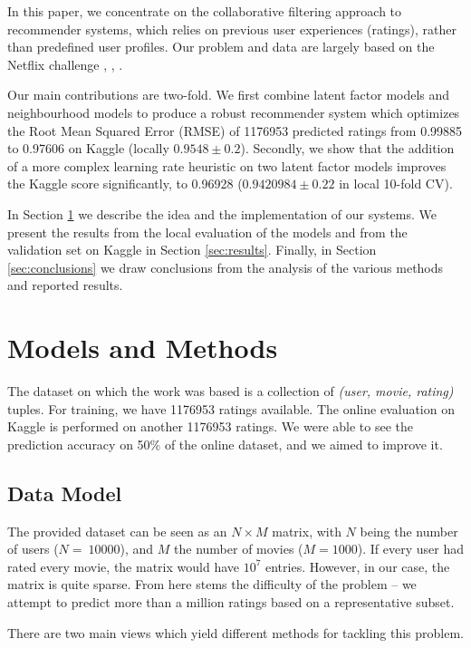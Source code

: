 \documentclass[10pt,conference,compsocconf]{IEEEtran}
\begin{document}
	In this paper, we concentrate on the collaborative filtering approach to recommender systems, which relies on previous user experiences (ratings), rather than predefined user profiles. Our problem and data are largely based on the Netflix challenge \cite{SMH07}, \cite{Koren09matrixfactorization}, \cite{funk2011netflix}.
	
	Our main contributions are two-fold. We first combine latent factor models and neighbourhood models to produce a robust recommender system which optimizes the Root Mean Squared Error (RMSE) of 1176953 predicted ratings from  0.99885 to 0.97606 on Kaggle (locally $0.9548\pm0.2$). Secondly, we show that the addition of a more complex learning rate heuristic on two latent factor models improves the Kaggle score significantly, to 0.96928 ($0.9420984\pm{0.22}$ in local 10-fold CV).
	
	In Section \ref{sec:models} we describe the idea and the implementation of our systems. We present the results from the local evaluation of the models and from the validation set on Kaggle in Section \ref{sec:results}. Finally, in Section \ref{sec:conclusions} we draw conclusions from the analysis of the various methods and reported results.
	
	
	\section{Models and Methods}
	\label{sec:models}
	The dataset on which the work was based is a collection of \emph{(user, movie, rating)} tuples. For training, we have 1176953 ratings available. The online evaluation on Kaggle is performed on another 1176953 ratings. We were able to see the prediction accuracy on 50\% of the online dataset, and we aimed to improve it.
	\subsection{Data Model}
	
	The provided dataset can be seen as an $N\times M$ matrix, with $N$ being the number of users ($N=~10000$), and $M$ the number of movies ($M=1000$). If every user had rated every movie, the matrix would have $10^7$ entries. However, in our case, the matrix is quite sparse. From here stems the difficulty of the problem -- we attempt to predict more than a million ratings based on a representative subset. 
	
	There are two main views which yield different methods for tackling this problem.
	
\end{document}
